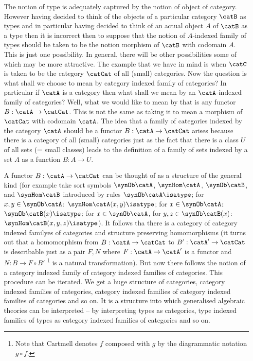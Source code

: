 The notion of type is adequately captured by the notion of object of category.
%
However having decided to think of the objects of a particular category $\catB$ as types and in particular having decided to think of an actual object $A$ of $\catB$ as a type then it is incorrect then to suppose that the notion of $A$-indexed family of types should be taken to be the notion morphism of $\catB$ with codomain $A$.
%
This is just one possibility. In general, there will be other possibilities some of which may be more attractive.
%
The example that we have in mind is when $\catC$ is taken to be the category $\catCat$ of all (small) categories.
%
Now the question is what shall we choose to mean by category indexed family of categories? In particular if $\catA$ is a category then what shall we mean by an $\catA$-indexed family of categories?
%
Well, what we would like to mean by that is any functor $B:\catA\to\catCat$. This is not the same as taking it to mean a morphism of $\catCat$ with codomain $\catA$.
%
The idea that a family of categories indexed by the category $\catA$ should be a functor $B:\catA\to\catCat$ arises because there is a category of all (small) categories just as the fact that there is a class $U$ of all sets (= small classes) leads to the definition of a family of sets indexed by a set $A$ as a function $B:A\to U$.

A functor $B:\catA\to\catCat$ can be thought of as a structure of the general kind (for example take sort symbols $\synOb\catA$, $\synHom\catA$, $\synOb\catB$, and $\synHom\catB$ introduced by rules $\synOb\catA\isatype$; for $x,y\in \synOb\catA$: $\synHom\catA(x,y)\isatype$; for $x\in \synOb\catA$: $\synOb\catB(x)\isatype$; for $x\in\synOb\catA$, for $y,z\in\synOb\catB(x)$: $\synHom\catB(x,y,z)\isatype$).
%
It follows tha there is a category of category indexed familyes of categories and structure preserving homomorphisms (it turns out that a homomorphism from $B:\catA\to\catCat$ to $B':\catA'\to\catCat$ is describable just as a pair $F,N$ where $F:\catA\to\catA'$ is a functor and $N:B\to F\circ B'$ \footnote{Note that Cartmell denotes $f$ composed with $g$ by the diagrammatic notation $g\circ f$.} is a natural transformation).
%
But now there follows the notion of a category indexed family of category indexed families of categories.
%
This procedure can be iterated.
%
We get a huge structure of categories, category indexed families of categories, category indexed families of category indexed families of categories and so on.
%
It is a structure into which generalised algebraic theories can be interpreted -- by interpreting types as categories, type indexed families of types as category indexed families of categories and so on.

